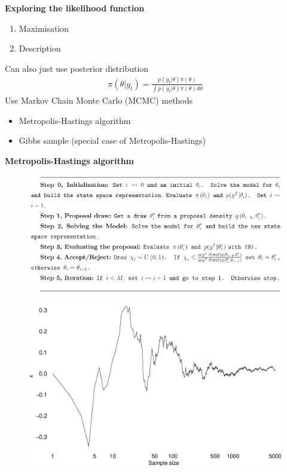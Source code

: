 \documentclass{beamer}
\begin{document}
\begin{frame}
  \textbf{Exploring the likelihood function}
  \begin{enumerate}
    \item Maximisation
    \item Description
  \end{enumerate}
  \medskip
  Can also just use posterior distribution
  \begin{align}
    \pi(\theta|y_t) = \frac{p(y_t|\theta)\pi(\theta)}{\int p(y_t|\theta)\pi(\theta)d\theta}
  \end{align}
  \medskip
  Use Markov Chain Monte Carlo (MCMC) methods
  \begin{itemize}
    \item Metropolis-Hastings algorithm
    \item Gibbs sample (special case of Metropolis-Hastings)
  \end{itemize}
\end{frame}

\begin{frame}
  \textbf{Metropolis-Hastings algorithm}
  \begin{figure}
    \includegraphics[scale=.8]{metropolis.eps}
  \end{figure}
\end{frame}

\begin{frame}
  \begin{figure}
    \includegraphics[scale=.3]{gibbs1.eps}
  \end{figure}
\end{frame}
\end{document}
